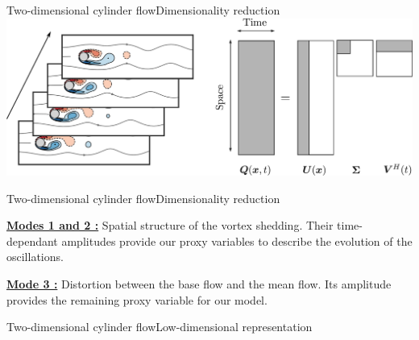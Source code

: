 \documentclass[usenames,dvipsnames,svgnames,10pt,aspectratio=169]{beamer}
\begin{document}
\begin{frame}[t, c]{Two-dimensional cylinder flow}{Dimensionality reduction}
  \centering
  \includegraphics[width=.8\textwidth]{svd_pod}
\end{frame}




\begin{frame}[t, c]{Two-dimensional cylinder flow}{Dimensionality reduction}
  \begin{minipage}{.68\textwidth}
    \underline{\textbf{Modes 1 and 2 :}} Spatial structure of the vortex shedding.
    Their time-dependant amplitudes provide our proxy variables to describe the evolution of the oscillations.

    \bigskip

    \underline{\textbf{Mode 3 :}} Distortion between the base flow and the mean flow.
    Its amplitude provides the remaining proxy variable for our model.
  \end{minipage}%
  \hfill
  \begin{minipage}{.28\textwidth}

  \end{minipage}

  \vspace{1cm}
\end{frame}




\begin{frame}[t, c]{Two-dimensional cylinder flow}{Low-dimensional representation}
  
\end{frame}
\end{document}
